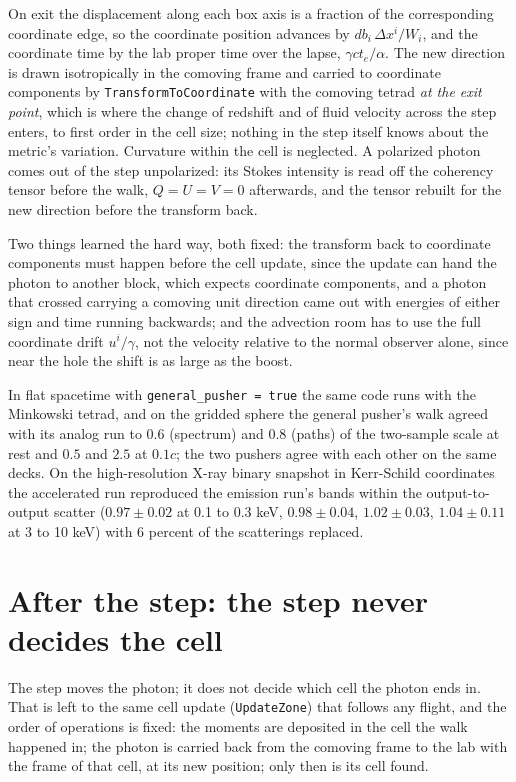 \documentclass[11pt]{article}
\newcommand{\key}[1]{\texttt{#1}}
\begin{document}
On exit the displacement along each box axis is a fraction of the corresponding
coordinate edge, so the coordinate position advances by $db_i\,\Delta x^i/W_i$, and the
coordinate time by the lab proper time over the lapse, $\gamma ct_e/\alpha$.  The new
direction is drawn isotropically in the comoving frame and carried to coordinate
components by \texttt{TransformToCoordinate} with the comoving tetrad \emph{at the exit
point}, which is where the change of redshift and of fluid velocity across the step
enters, to first order in the cell size; nothing in the step itself knows about the
metric's variation.  Curvature within the cell is neglected.  A polarized photon comes
out of the step unpolarized: its Stokes intensity is read off the coherency tensor before
the walk, $Q=U=V=0$ afterwards, and the tensor rebuilt for the new direction before the
transform back.

Two things learned the hard way, both fixed: the transform back to coordinate components
must happen before the cell update, since the update can hand the photon to another
block, which expects coordinate components, and a photon that crossed carrying a
comoving unit direction came out with energies of either sign and time running
backwards; and the advection room has to use the full coordinate drift $u^i/\gamma$,
not the velocity relative to the normal observer alone, since near the hole the shift is
as large as the boost.

In flat spacetime with \key{general\_pusher = true} the same code runs with the
Minkowski tetrad, and on the gridded sphere the general pusher's walk agreed with its
analog run to $0.6$ (spectrum) and $0.8$ (paths) of the two-sample scale at rest and
$0.5$ and $2.5$ at $0.1c$; the two pushers agree with each other on the same decks.  On
the high-resolution X-ray binary snapshot in Kerr-Schild coordinates the accelerated run
reproduced the emission run's bands within the output-to-output scatter
($0.97\pm0.02$ at 0.1 to 0.3 keV, $0.98\pm0.04$, $1.02\pm0.03$, $1.04\pm0.11$ at 3 to
10 keV) with 6 percent of the scatterings replaced.

\section{After the step: the step never decides the cell}
\label{sec:after}

The step moves the photon; it does not decide which cell the photon ends in.  That is
left to the same cell update (\texttt{UpdateZone}) that follows any flight, and the order
of operations is fixed: the moments are deposited in the cell the walk happened in; the
photon is carried back from the comoving frame to the lab with the frame of that cell,
at its new position; only then is its cell found.
\end{document}
